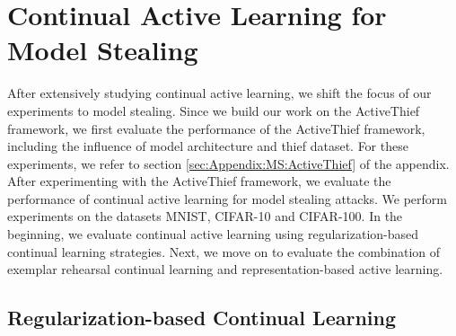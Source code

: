 \section{Continual Active Learning for Model Stealing}
\label{sec:Evaluation:MS}
After extensively studying continual active learning, we shift the focus of our experiments to model stealing. Since we build our work on the ActiveThief framework,
we first evaluate the performance of the ActiveThief framework, including the influence of model architecture and thief dataset. For these experiments, we refer to
section \ref{sec:Appendix:MS:ActiveThief} of the appendix. After experimenting with the ActiveThief framework, we evaluate the performance of continual active learning
for model stealing attacks. We perform experiments on the datasets MNIST, CIFAR-10 and CIFAR-100. In the beginning, we evaluate continual active learning using
regularization-based continual learning strategies. Next, we move on to evaluate the combination of exemplar rehearsal continual learning and representation-based
active learning. \par


\subsection{Regularization-based Continual Learning}
\label{sec:Evaluation:MS:Regularization}

